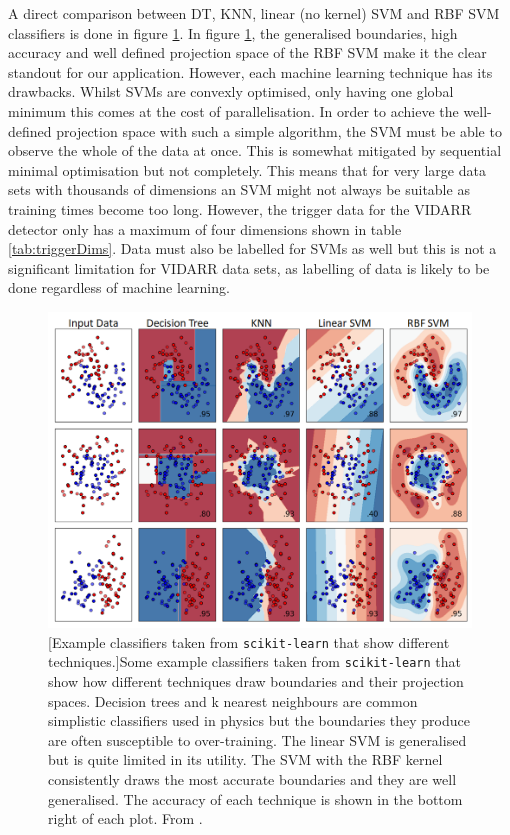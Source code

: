 A direct comparison between DT, KNN, linear (no kernel) SVM and RBF SVM classifiers is done in figure \ref{fig:sklearnReleventExamples}. In figure \ref{fig:sklearnReleventExamples}, the generalised boundaries, high accuracy and well defined projection space of the RBF SVM make it the clear standout for our application. However, each machine learning technique has its drawbacks. Whilst SVMs are convexly optimised, only having one global minimum \cite{Boser92atraining} this comes at the cost of parallelisation. In order to achieve the well-defined projection space with such a simple algorithm, the SVM must be able to observe the whole of the data at once. This is somewhat mitigated by sequential minimal optimisation \cite{platt1998sequential} but not completely. This means that for very large data sets with thousands of dimensions an SVM might not always be suitable as training times become too long. However, the trigger data for the VIDARR detector only has a maximum of four dimensions shown in table \ref{tab:triggerDims}. Data must also be labelled for SVMs as well but this is not a significant limitation for VIDARR data sets, as labelling of data is likely to be done regardless of machine learning.
 
\begin{figure}[!h]
\centering
\includegraphics[width=0.9\linewidth]{Chapter4/Figs/Raster/svmLinAndRbf/sklearnReleventExamplesMedText.png}
[Example classifiers taken from \texttt{scikit-learn} that show different techniques.]{Some example classifiers taken from \texttt{scikit-learn} that show how different techniques draw boundaries and their projection spaces. Decision trees and k nearest neighbours are common simplistic classifiers used in physics but the boundaries they produce are often susceptible to over-training. The linear SVM is generalised but is quite limited in its utility. The SVM with the RBF kernel consistently draws the most accurate boundaries and they are well generalised. The accuracy of each technique is shown in the bottom right of each plot. From \cite{scikit-learn}.} 
\label{fig:sklearnReleventExamples}
\end{figure}

